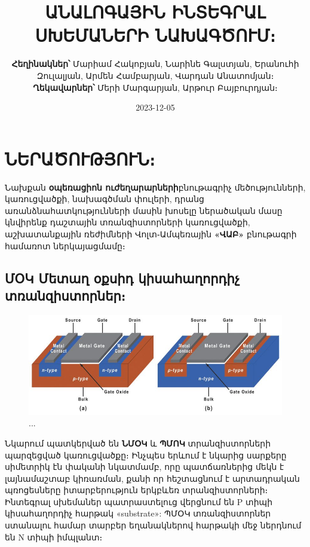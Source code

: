 \documentclass[
]{book}
\title{ԱՆԱԼՈԳԱՅԻՆ ԻՆՏԵԳՐԱԼ ՍԽԵՄԱՆԵՐԻ ՆԱԽԱԳԾՈՒՄ։}
\author{\textbf{Հեղինակներ՝} Մարիամ Հակոբյան, Նարինե Գալստյան, Երանուհի
Զուլալյան, Արմեն Համբարյան, Վարդան Անատոմյան։ \textbf{Ղեկավարներ՝} Մերի
Մարգարյան, Արթուր Բայբուրդյան։}
\date{2023-12-05}
\begin{document}
\frontmatter
\maketitle

\mainmatter
\hypertarget{ux576ux565ux580ux561ux56eux578ux582ux569ux575ux578ux582ux576}{%
\chapter{ՆԵՐԱԾՈՒԹՅՈՒՆ։}\label{ux576ux565ux580ux561ux56eux578ux582ux569ux575ux578ux582ux576}}

Նախքան \textbf{օպեռացիոն ուժեղարարների}բնութագրիչ մեծությունների,
կառուցվածքի, նախագծման փուլերի, դրանց առանձնահատկությունների մասին
խոսելը ներածական մասը կնվիրենք դաշտային տռանզիստորների կառուցվածքի,
աշխատանքային ռեժիմների Վոլտ֊Ամպեռային \textbf{«ՎԱԲ»} բնութագրի համառոտ
ներկայացմամը։

\hypertarget{ux574ux585ux56f-ux574ux565ux57fux561ux572-ux585ux584ux57dux56bux564-ux56fux56bux57dux561ux570ux561ux572ux578ux580ux564ux56bux579-ux57fux57cux561ux576ux566ux56bux57dux57fux578ux580ux576ux565ux580}{%
\section{ՄՕԿ Մետաղ օքսիդ կիսահաղորդիչ
տռանզիստորներ։}\label{ux574ux585ux56f-ux574ux565ux57fux561ux572-ux585ux584ux57dux56bux564-ux56fux56bux57dux561ux570ux561ux572ux578ux580ux564ux56bux579-ux57fux57cux561ux576ux566ux56bux57dux57fux578ux580ux576ux565ux580}}

\begin{figure}

{\centering \includegraphics[width=1\linewidth]{imige/mostex} 

}

\caption{...}\label{fig:unnamed-chunk-1}
\end{figure}

Նկարում պատկերված են \textbf{ՆՄՕԿ} և \textbf{ՊՄՈԿ} տրանզիստորների
պարզեցված կառուցվածքը։ Ինչպես երևում է նկարից սարքերը սիմետրիկ էն փականի
նկատմամբ, որը պատճառներից մեկն է լայնամաշտաբ կիռառման, քանի որ
հեշտացնում է արտադրական պռոցեսները իտարբերություն երկբևեռ
տրանզիստորների։ Ինտեգրալ սխեմաներ պատրաստելուց վերցնում են P տիպի
կիսահաղորդիչ հարթակ «substrate»: ՊՄՕԿ տռանզիստորներ ստանալու համար
տարբեր եղանակներով հարթակի մեջ ներդնում են N տիպի իմպլանտ։
\end{document}
